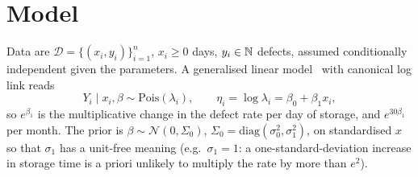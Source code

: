 \documentclass[10pt,twocolumn]{article}
\newcommand{\D}{\mathcal D}
\newcommand{\Pois}{\mathrm{Pois}}
\begin{document}
\maketitle

\begin{abstract}
\noindent With about $100$ products, we model the number of defects $Y$ as a function of storage time $X$ by a Bayesian Poisson regression with log link. We prove that the posterior is strictly log-concave, which justifies Laplace and Hamiltonian Monte Carlo inference; we show that the naive quantity $P(\beta_1\neq0\mid\D)$ is identically $1$ under a continuous prior and replace it by directional probabilities, a region of practical equivalence and a Savage--Dickey Bayes factor; we derive Rao--Blackwellised estimators of the probability that a product falls into a defect band, prove that these probabilities are monotone in storage time, and turn them into a maximal storage time at a given risk level. Conditions for a causal reading and model checks (overdispersion, WAIC, LOO) are made explicit.
\end{abstract}

\section{Model}
Data are $\D=\{(x_i,y_i)\}_{i=1}^n$, $x_i\ge0$ days, $y_i\in\mathbb{N}$ defects, assumed conditionally independent given the parameters. A generalised linear model~\cite{mccullagh1989} with canonical log link reads
\begin{equation}
Y_i\mid x_i,\beta\sim\Pois(\lambda_i),\qquad\eta_i=\log\lambda_i=\beta_0+\beta_1x_i,
\end{equation}
so $e^{\beta_1}$ is the multiplicative change in the defect rate per day of storage, and $e^{30\beta_1}$ per month. The prior is $\beta\sim\mathcal N(0,\Sigma_0)$, $\Sigma_0=\mathrm{diag}(\sigma_0^2,\sigma_1^2)$, on standardised $x$ so that $\sigma_1$ has a unit-free meaning (e.g.\ $\sigma_1=1$: a one-standard-deviation increase in storage time is a priori unlikely to multiply the rate by more than $e^2$).
\end{document}
